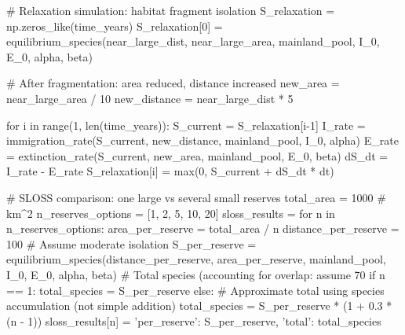 \documentclass[a4paper, 11pt]{article}
\begin{document}
\begin{pycode}
# Relaxation simulation: habitat fragment isolation
S_relaxation = np.zeros_like(time_years)
S_relaxation[0] = equilibrium_species(near_large_dist, near_large_area, mainland_pool, I_0, E_0, alpha, beta)

# After fragmentation: area reduced, distance increased
new_area = near_large_area / 10
new_distance = near_large_dist * 5

for i in range(1, len(time_years)):
    S_current = S_relaxation[i-1]
    I_rate = immigration_rate(S_current, new_distance, mainland_pool, I_0, alpha)
    E_rate = extinction_rate(S_current, new_area, mainland_pool, E_0, beta)
    dS_dt = I_rate - E_rate
    S_relaxation[i] = max(0, S_current + dS_dt * dt)

# SLOSS comparison: one large vs several small reserves
total_area = 1000  # km^2
n_reserves_options = [1, 2, 5, 10, 20]
sloss_results = {}
for n in n_reserves_options:
    area_per_reserve = total_area / n
    distance_per_reserve = 100  # Assume moderate isolation
    S_per_reserve = equilibrium_species(distance_per_reserve, area_per_reserve,
                                        mainland_pool, I_0, E_0, alpha, beta)
    # Total species (accounting for overlap: assume 70%
    if n == 1:
        total_species = S_per_reserve
    else:
        # Approximate total using species accumulation (not simple addition)
        total_species = S_per_reserve * (1 + 0.3 * (n - 1))
    sloss_results[n] = {'per_reserve': S_per_reserve, 'total': total_species}
\end{pycode}
\end{document}
